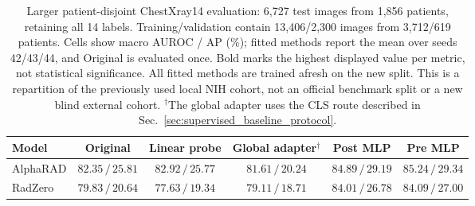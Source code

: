 \begin{table}[!t]
\centering
\small
\setlength{\tabcolsep}{4pt}
\renewcommand{\arraystretch}{1.15}
\begin{tabular*}{\textwidth}{@{\extracolsep{\fill}}lccccc@{}}
\toprule
Model & Original & Linear probe & Global adapter$^{\dagger}$ & Post MLP & Pre MLP \\
\midrule
AlphaRAD & $82.35\,/\,25.81$ & $82.92\,/\,25.77$ & $81.61\,/\,20.24$ & $84.89\,/\,29.19$ & $\mathbf{85.24}\,/\,\mathbf{29.34}$ \\
RadZero & $79.83\,/\,20.64$ & $77.63\,/\,19.34$ & $79.11\,/\,18.71$ & $84.01\,/\,26.78$ & $\mathbf{84.09}\,/\,\mathbf{27.00}$ \\
\bottomrule
\end{tabular*}
\caption{Larger patient-disjoint ChestXray14 evaluation: 6,727 test images from 1,856 patients, retaining all 14 labels. Training/validation contain 13,406/2,300 images from 3,712/619 patients. Cells show macro AUROC / AP (\%); fitted methods report the mean over seeds 42/43/44, and Original is evaluated once. Bold marks the highest displayed value per metric, not statistical significance. All fitted methods are trained afresh on the new split. This is a repartition of the previously used local NIH cohort, not an official benchmark split or a new blind external cohort. $^{\dagger}$The global adapter uses the CLS route described in Sec.~\ref{sec:supervised_baseline_protocol}.}
\label{tab:token_mlp_large_patient}
\end{table}

